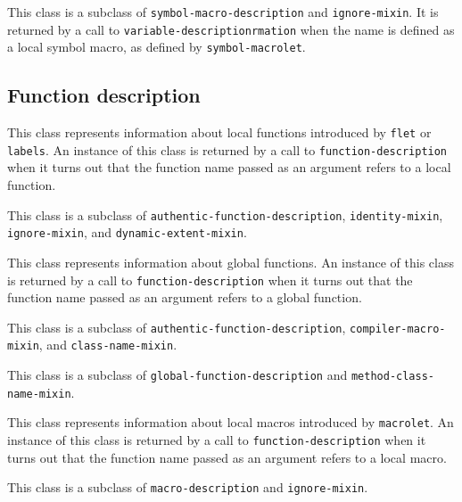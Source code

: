 {\footnotesize
{}
}

This class is a subclass of \texttt{symbol-macro-description} and
\texttt{ignore-mixin}.  It is returned by a call to
\texttt{variable-descriptionrmation} when the name is defined as a local
symbol macro, as defined by \texttt{symbol-macrolet}.

\subsection{Function description}
\label{sec-instantiable-classes-function-desciption}

{\footnotesize
{}
}

This class represents information about local functions introduced by
\texttt{flet} or \texttt{labels}.  An instance of this class is
returned by a call to \texttt{function-description} when it turns out that
the function name passed as an argument refers to a local function.

This class is a subclass of \texttt{authentic-function-description},
\texttt{identity-mixin}, \texttt{ignore-mixin}, and \texttt{dynamic-extent-mixin}.

{\footnotesize
{}
}

This class represents information about global functions.  An instance
of this class is returned by a call to \texttt{function-description} when it
turns out that the function name passed as an argument refers to a
global function.

This class is a subclass of \texttt{authentic-function-description},
\texttt{compiler-macro-mixin}, and \texttt{class-name-mixin}.

{\footnotesize
{}
}

This class is a subclass of \texttt{global-function-description} and
\texttt{method-class-name-mixin}.


{\footnotesize
{}
}

This class represents information about local macros introduced by
\texttt{macrolet}.  An instance of this class is returned by a call to
\texttt{function-description} when it turns out that the function name passed
as an argument refers to a local macro.

This class is a subclass of \texttt{macro-description} and \texttt{ignore-mixin}.

{\footnotesize
{}
}

